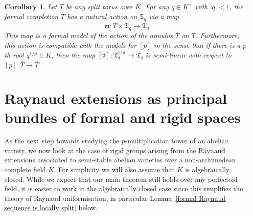 \documentclass[10pt,oneside]{amsart}
\newtheorem{corollary}[theorem]{Corollary}
\theoremstyle{definition}
\begin{document}
	\begin{corollary}\label{action on formal model of torus}
		Let $T$ be any split torus over $K$. For any $q\in K^\times$ with $|q|<1$, the formal completion $\overline{T}$ has a natural action on $\mathfrak T_q$ via a map
		\[\mathfrak m:\overline{T}\times \mathfrak T_q\rightarrow \mathfrak T_q.\]
		This map is a formal model of the action of the annulus $\overline{T}$ on $T$. Furthermore, this action is compatible with the models for $[p]$ in the sense that if there is a $p$-th root $q^{1/p}\in K$, then the map $[\mathfrak p]:\mathfrak T_q^{1/p}\rightarrow \mathfrak T_q$ is semi-linear with respect to $[p]:\overline{T}\rightarrow \overline{T}$.
	\end{corollary} 
	
	\section{Raynaud extensions as principal bundles of formal and rigid spaces}\label{Raynaud extensions as principal bundles of formal and rigid spaces}
	As the next step towards studying the $p$-multiplication tower of an abelian variety, we now look at the case of rigid groups arising from the Raynaud extensions associated to semi-stable abelian varieties over a non-archimedean complete field $K$. For simplicity we will also assume that $K$ is algebraically closed.
	While we expect that our main theorem still holds over any perfectoid field, it is easier to work in the algebraically closed case since this simplifies the theory of Raynaud uniformisation, in particular Lemma~\ref{formal Raynaud sequence is locally split} below.
	
\end{document}
